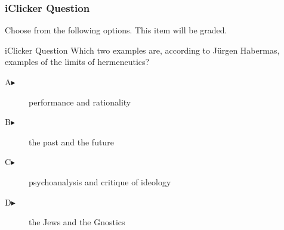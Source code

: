 \begin{frame}
  \frametitle{iClicker Question}
Choose from the following options. This item will be graded.
\begin{block}{iClicker Question}
Which two examples are, according to J{\"u}rgen Habermas, examples of
the limits of hermeneutics?
\end{block}
\begin{description}
\item[A\hspace{.2in}$\blacktriangleright$] performance and rationality
\item[B\hspace{.2in}$\blacktriangleright$] the past and the future
\item[C\hspace{.2in}$\blacktriangleright$] psychoanalysis and critique of ideology
\item[D\hspace{.2in}$\blacktriangleright$] the Jews and the Gnostics
\end{description}
\end{frame}
